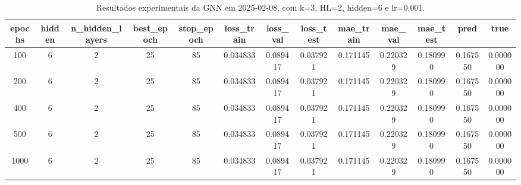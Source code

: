\begin{table}[h]
\centering
\caption{Resultados experimentais da GNN em 2025-02-08, com k=3, HL=2, hidden=6 e lr=0.001.}
\label{tab:gnn_results_k3_hl2_h6_d20250208}
\begin{tabular}{ccccccccccccc}
\toprule
epochs & hidden & n\_hidden\_layers & best\_epoch & stop\_epoch & loss\_train & loss\_val & loss\_test & mae\_train & mae\_val & mae\_test & pred & true \\
\midrule
100 & 6 & 2 & 25 & 85 & 0.034833 & 0.089417 & 0.037921 & 0.171145 & 0.220329 & 0.180990 & 0.167550 & 0.000000 \\
200 & 6 & 2 & 25 & 85 & 0.034833 & 0.089417 & 0.037921 & 0.171145 & 0.220329 & 0.180990 & 0.167550 & 0.000000 \\
400 & 6 & 2 & 25 & 85 & 0.034833 & 0.089417 & 0.037921 & 0.171145 & 0.220329 & 0.180990 & 0.167550 & 0.000000 \\
500 & 6 & 2 & 25 & 85 & 0.034833 & 0.089417 & 0.037921 & 0.171145 & 0.220329 & 0.180990 & 0.167550 & 0.000000 \\
1000 & 6 & 2 & 25 & 85 & 0.034833 & 0.089417 & 0.037921 & 0.171145 & 0.220329 & 0.180990 & 0.167550 & 0.000000 \\
\bottomrule
\end{tabular}
\end{table}
